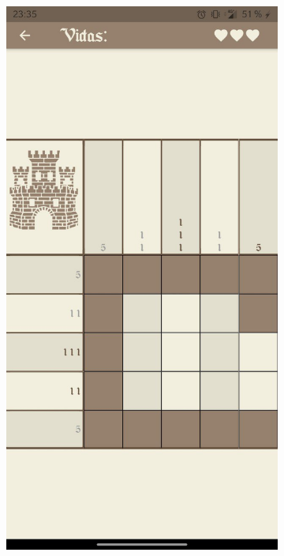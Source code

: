 \begin{figure}[H]
    \begin{subfigure}[b]{0.22\linewidth}
      \includegraphics[width=\linewidth]{images/man13.jpeg}
    \end{subfigure}
    \begin{subfigure}[b]{0.22\linewidth}

\end{subfigure}
\end{figure}
